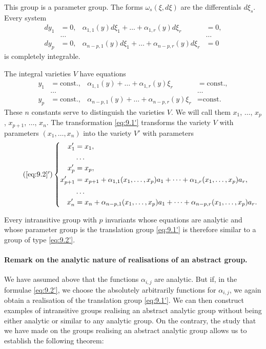 This group is a parameter group. The forms $\omega_{s}(\xi,d\xi)$ are the differentials $d\xi_{s}$. Every system
\begin{align*}
  dy_{1}&=0,&\alpha_{1,1}(y)d\xi_{1}+\dots+\alpha_{1,r}(y)d\xi_{r}&=0,\\
  &\dots&&\dots\\
  dy_{p}&=0,&\alpha_{n-p,1}(y)d\xi_{1}+\dots+\alpha_{n-p,r}(y)d\xi_{r}&=0
\end{align*}
is completely integrable.

The integral varieties $V$ have equations
\begin{align*}
  y_{1}&=\text{const.},&\alpha_{1,1}(y)+\dots+\alpha_{1,r}(y)\xi_{r}&=\text{const.},\\
  &\dots&&\dots\\
  y_{p}&=\text{const.},&\alpha_{n-p,1}(y)+\dots+\alpha_{n-p,r}(y)\xi_{r}&=\text{const.}
\end{align*}
These $n$ constants serve to distinguish the varieties $V$. We will call them $x_{1}$, $\dots$, $x_{p}$, $x_{p+1}$, $\dots$, $x_{n}$. The transformation \eqref{eq:9.1'} transforms the variety $V$ with parameters $(x_{1}, \dots, x_{n})$ into the variety $V'$ with parameters
\begin{equation}
  \label{eq:9.2'}\tag{\ref{eq:9.2}$'$}
  \left\{
    \begin{aligned}
      x'_{1}&=x_{1},\\
      &\dots\\
      x'_{p}&=x_{p},\\
      x'_{p+1}&=x_{p+1}+\alpha_{1,1}(x_{1},\dots,x_{p})a_{1}+\dots+\alpha_{1,r}(x_{1},\dots,x_{p})a_{r},\\
      &\dots\\
      x'_{n}&=x_{n}+\alpha_{n-p,1}(x_{1},\dots,x_{p})a_{1}+\dots+\alpha_{n-p,r}(x_{1},\dots,x_{p})a_{r}.      
    \end{aligned}
  \right.
\end{equation}

Every intransitive group with $p$ invariants whose equations are analytic and whose parameter group is the translation group \eqref{eq:9.1'} is therefore similar to a group of type \eqref{eq:9.2'}.



\paragraph{Remark on the analytic nature of realisations of an abstract group.}
\label{sec:121}
We have assumed above that the functions $\alpha_{i,j}$ are analytic. But if, in the formulae \eqref{eq:9.2'}, we choose the absolutely arbitrarily functions for $\alpha_{i,j}$, we again obtain a realisation of the translation group \eqref{eq:9.1'}. We can then construct examples of intransitive groups realising an abstract analytic group without being either analytic or similar to any analytic group. On the contrary, the study that we have made on the groups realising an abstract analytic group allows us to establish the following theorem:

